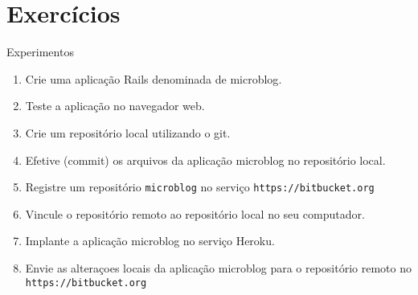 \section{Exercícios}
\begin{frame}{Experimentos}
  \begin{enumerate}
    \item Crie uma aplicação Rails denominada de \alert{microblog}.
    \item Teste a aplicação no navegador web.
    \item Crie um repositório local utilizando o git.
    \item Efetive (commit) os arquivos da aplicação microblog no repositório local.
    \item Registre um repositório \verb!microblog! no serviço \verb!https://bitbucket.org!
    \item Vincule o repositório remoto ao repositório local no seu computador.
    \item Implante a aplicação microblog no serviço Heroku.
    \item Envie as alteraçoes locais da aplicação microblog para o repositório remoto 
      no \verb!https://bitbucket.org!
  \end{enumerate}
\end{frame} 
